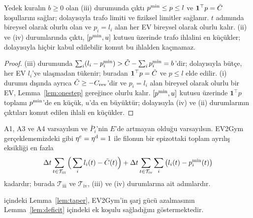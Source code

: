 \begin{lemma}\label{lem:fallback}
Yedek kuralın $b\ge0$ olan (iii) durumunda çıktı $p^{\min}\le p\le l$ ve $\mathbf 1^\top p=\tilde C$ koşullarını sağlar; dolayısıyla trafo limiti ve fiziksel limitler sağlanır.
$t$ adımında bireysel olarak olurlu olan ve $p_i=l_i$ alan her EV bireysel olarak olurlu kalır.
(ii) ve (iv) durumlarında çıktı, $[p^{\min},u]$ kutusu üzerinde trafo ihlalini en küçükler; dolayısıyla hiçbir kabul edilebilir komut bu ihlalden kaçınamaz.
\end{lemma}

\begin{proof}
(iii) durumunda $\sum_i(l_i-p^{\min}_i)>\tilde C-\sum_ip^{\min}_i=b$'dir; dolayısıyla bütçe, her EV $l_i$'ye ulaşmadan tükenir; buradan $\mathbf 1^\top p=\tilde C$ ve $p\le l$ elde edilir.
(i) durumu dışında ayrıca $\tilde C\ge-C_{\mathrm{rev}}$'dir ve $p_i=l_i$ alan bireysel olarak olurlu bir EV, Lemma~\ref{lem:onestep} gereğince olurlu kalır.
$[p^{\min},u]$ kutusu üzerinde $\mathbf 1^\top p$ toplamı $p^{\min}$'de en küçük, $u$'da en büyüktür; dolayısıyla (iv) ve (ii) durumlarının çıktıları komut edilen ihlali en küçükler.
\end{proof}

\begin{lemma}\label{lem:deficit}
A1, A3 ve A4 varsayılsın ve $\bar P_i$'nin $E$'de artmayan olduğu varsayılsın.
EV2Gym gerçeklememizdeki gibi $\eta^{\mathrm c}=\eta^{\mathrm d}=1$ ile filonun bir epizottaki toplam ayrılış eksikliği en fazla
\begin{equation}\label{eq:deficit}
\Delta t\sum_{t\in\mathcal T_{\mathrm{iii}}}\Big(\sum_il_i(t)-\tilde C(t)\Big)+\Delta t\sum_{t\in\mathcal T_{\mathrm{iv}}}\sum_i\big(l_i(t)-p^{\min}_i(t)\big)
\end{equation}
kadardır; burada $\mathcal T_{\mathrm{iii}}$ ve $\mathcal T_{\mathrm{iv}}$, (iii) ve (iv) durumlarına ait adımlardır.
\end{lemma}

 içindeki Lemma~\ref{lem:taper}, EV2Gym'in şarj gücü azalmasının Lemma~\ref{lem:deficit} içindeki ek koşulu sağladığını göstermektedir.

